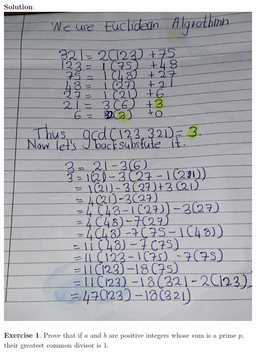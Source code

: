 \documentclass[
]{book}
\theoremstyle{definition}
\theoremstyle{definition}
\theoremstyle{definition}
\newtheorem{exercise}{Exercise}[chapter]
\theoremstyle{definition}
\theoremstyle{remark}
\begin{document}
\textbf{Solution}:
\includegraphics{figures/ch_2/fig20.jpg}

\begin{exercise}
\protect\hypertarget{exr:unnamed-chunk-69}{}\label{exr:unnamed-chunk-69}Prove that if \(a\) and \(b\) are positive integers whose sum is a prime \(p\), their greatest common
divisor is \(1\).
\end{exercise}
\end{document}

